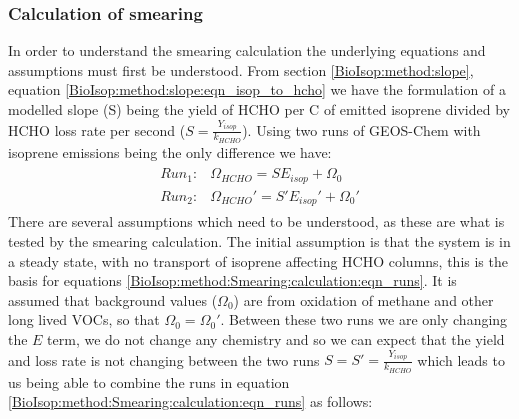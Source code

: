     
    
    \subsubsection{Calculation of smearing}
      \label{BioIsop:method:Smearing:calculation}
      
      In order to understand the smearing calculation the underlying equations and assumptions must first be understood.
      From section \ref{BioIsop:method:slope}, equation \ref{BioIsop:method:slope:eqn_isop_to_hcho} we have the formulation of a modelled slope (S) being the yield of HCHO per C of emitted isoprene divided by HCHO loss rate per second ($S = \frac{Y_{isop}}{k_{HCHO}}$).
      Using two runs of GEOS-Chem with isoprene emissions being the only difference we have:
      \begin{eqnarray}
        \label{BioIsop:method:Smearing:calculation:eqn_runs}
        \begin{split}
        Run_1 :&  \Omega_{HCHO} = S E_{isop} + \Omega_0 \\
        Run_2 :&  \Omega_{HCHO}' = S' E_{isop}' + \Omega_0' 
        \end{split}
      \end{eqnarray}
      There are several assumptions which need to be understood, as these are what is tested by the smearing calculation.
      The initial assumption is that the system is in a steady state, with no transport of isoprene affecting HCHO columns, this is the basis for equations \ref{BioIsop:method:Smearing:calculation:eqn_runs}.
      It is assumed that background values ($\Omega_0$) are from oxidation of methane and other long lived VOCs, so that $\Omega_0 = \Omega_0'$.
      Between these two runs we are only changing the $E$ term, we do not change any chemistry and so we can expect that the yield and loss rate is not changing between the two runs $S = S' = \frac{Y_{isop}}{k_{HCHO}}$
      which leads to us being able to combine the runs in equation \ref{BioIsop:method:Smearing:calculation:eqn_runs} as follows:
